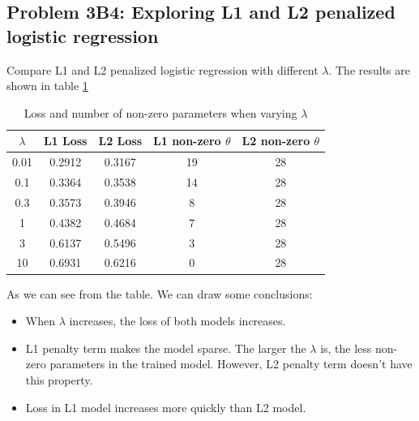\documentclass[]{book}
\theoremstyle{definition}
\begin{document}
\subsection*{Problem 3B4: Exploring L1 and L2 penalized logistic regression}
Compare L1 and L2 penalized logistic regression with different $\lambda$. The results are shown in table \ref{tab:L1_L2}
\begin{table}[H]
	\centering
	\begin{tabular}{ccccc}
		\hline 
		$\lambda$ & L1 Loss & L2 Loss & L1 non-zero $\theta$ & L2 non-zero $\theta$ \\ 
		\hline 
		0.01 & 0.2912 & 0.3167 & 19 & 28 \\ 
		
		0.1 & 0.3364 & 0.3538 & 14 & 28 \\ 
		
		0.3 & 0.3573 & 0.3946 & 8 & 28 \\ 
		
		1 & 0.4382 & 0.4684 & 7 & 28 \\ 
		
		3 &  0.6137 & 0.5496 & 3 & 28 \\ 
		
		10 & 0.6931 & 0.6216 & 0 & 28 \\ 
		\hline 
	\end{tabular} 
	\caption{Loss and number of non-zero parameters when varying $\lambda$}
	\label{tab:L1_L2}
\end{table}
As we can see from the table. We can draw some conclusions:
\begin{itemize}
	\item When $\lambda$ increases, the loss of both models increases.
	\item L1 penalty term makes the model sparse. The larger the $\lambda$ is, the less non-zero parameters in the trained model. However, L2 penalty term doesn't have this property.
	\item Loss in L1 model increases more quickly than L2 model. 
\end{itemize}
\end{document}

